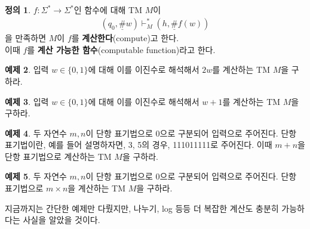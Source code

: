\documentclass[b5paper, 11pt]{book}
\theoremstyle{definition}
\newtheorem{defn}{정의}[chapter]
\newtheorem{ex}[defn]{예제}
\begin{document}
\begin{defn}
    $f: \Sigma^* \rightarrow \Sigma^*$인 함수에 대해 TM $M$이
    \begin{align*}
        (q_0, \underline{\#}w) \vdash_M^* (h, \underline{\#}f(w))
    \end{align*}
    을 만족하면 $M$이 $f$를 \textbf{계산한다}(compute)고 한다. \\ 
    이때 $f$를 \textbf{계산 가능한 함수}(computable function)라고 한다. 
\end{defn}
\begin{ex}
    입력 $w \in \{0,1\}$에 대해 이를 이진수로 해석해서 $2w$를 계산하는 TM $M$을 구하라. 
\end{ex}
\begin{ex}
    입력 $w \in \{0,1\}$에 대해 이를 이진수로 해석해서 $w + 1$를 계산하는 TM $M$을 구하라. 
\end{ex}
\begin{ex}
    두 자연수 $m, n$이 단항 표기법으로 0으로 구분되어 입력으로 주어진다. 단항 표기법이란, 예를 들어 설명하자면, 3, 5의 경우, 111011111로 주어진다. 이때 $m+n$을 단항 표기법으로 계산하는 TM $M$을 구하라. 
\end{ex}
\begin{ex}
    두 자연수 $m,n$이 단항 표기법으로 0으로 구분되어 입력으로 주어진다. 단항 표기법으로 $m \times n$을 계산하는 TM $M$을 구하라. 
\end{ex}
지금까지는 간단한 예제만 다뤘지만, 나누기, log 등등 더 복잡한 계산도 충분히 가능하다는 사실을 알았을 것이다.
\end{document}
